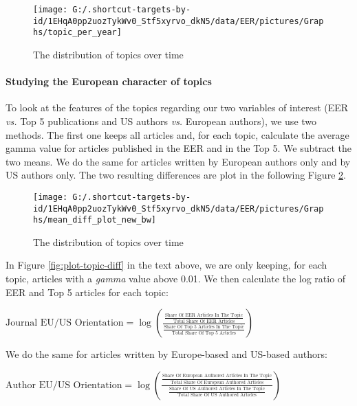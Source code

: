 \documentclass[]{elsarticle} %
\begin{document}
\begin{figure}[h]

{\centering \texttt{[image: G:/.shortcut-targets-by-id/1EHqA0pp2uozTykWv0\_Stf5xyrvo\_dkN5/data/EER/pictures/Graphs/topic\_per\_year]} 

}

\caption{The distribution of topics over time}\label{fig:plot-topic-year}
\end{figure}

\hypertarget{studying-the-european-character-of-topics}{%
\paragraph*{Studying the European character of
topics}\label{studying-the-european-character-of-topics}}

To look at the features of the topics regarding our two variables of
interest (EER \emph{vs.} Top 5 publications and US authors \emph{vs.}
European authors), we use two methods. The first one keeps all articles
and, for each topic, calculate the average gamma value for articles
published in the EER and in the Top 5. We subtract the two means. We do
the same for articles written by European authors only and by US authors
only. The two resulting differences are plot in the following Figure
\ref{fig:plot-topic-diff-alternative}.

\begin{figure}[h]

{\centering \texttt{[image: G:/.shortcut-targets-by-id/1EHqA0pp2uozTykWv0\_Stf5xyrvo\_dkN5/data/EER/pictures/Graphs/mean\_diff\_plot\_new\_bw]} 

}

\caption{The distribution of topics over time}\label{fig:plot-topic-diff-alternative}
\end{figure}

In Figure \ref{fig:plot-topic-diff} in the text above, we are only
keeping, for each topic, articles with a \emph{gamma} value above 0.01.
We then calculate the log ratio of EER and Top 5 articles for each
topic:

\bigskip

\({\scriptstyle \text{Journal EU/US Orientation}=\log(\frac{\frac{\text{Share Of EER Articles In The Topic}}{\text{Total Share Of EER Articles}}} {\frac{\text{Share Of Top 5 Articles In The Topic}}{\text{Total Share Of Top 5 Articles}}})}\)

\bigskip

We do the same for articles written by Europe-based and US-based
authors:

\bigskip

\({\scriptstyle \text{Author EU/US Orientation}=\log(\frac{\frac{\text{Share Of European Authored Articles In The Topic}}{\text{Total Share Of European Authored Articles}}} {\frac{\text{Share Of US Authored Articles In The Topic}}{\text{Total Share Of US Authored Articles}}})}\)


\end{document}

